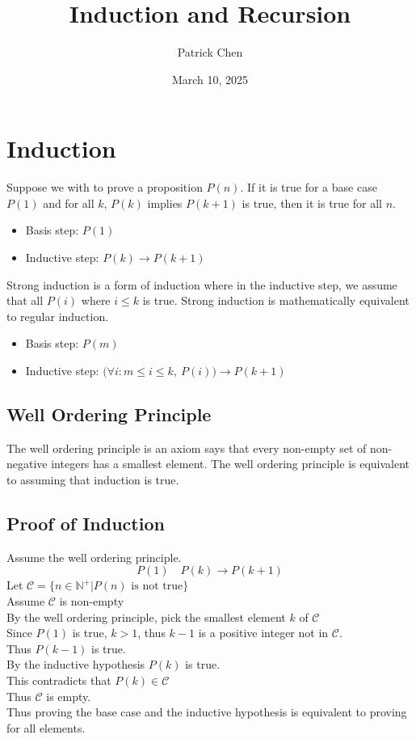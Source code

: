 \documentclass{article}
\title{Induction and Recursion}
\author{Patrick Chen}
\date{March 10, 2025}
\theoremstyle{mytheoremstyle}
\theoremstyle{mytheoremstyle}
\theoremstyle{myproblemstyle}
\begin{document}
    \maketitle
    \section*{Induction}
    Suppose we with to prove a proposition $P(n)$. If it is true for a base case
    $P(1)$ and for all $k$, $P(k)$ implies $P(k+1)$ is true, then it is true for
    all $n$.
    \begin{itemize}
        \item Basis step: $P(1)$
        \item Inductive step: $P(k) \rightarrow P(k+1)$
    \end{itemize}
    Strong induction is a form of induction where in the inductive step, we
    assume that all $P(i)$ where $i\le k$ is true. Strong induction is
    mathematically equivalent to regular induction.
    \begin{itemize}
        \item Basis step: $P(m)$
        \item Inductive step: $\Big(\forall i : m\le i\le k,\ P(i)\Big) \rightarrow P(k+1)$
    \end{itemize}

    \subsection*{Well Ordering Principle}
    The well ordering principle is an axiom says that every non-empty set of
    non-negative integers has a smallest element. The well ordering principle is
    equivalent to assuming that induction is true.

    \subsection*{Proof of Induction}
    Assume the well ordering principle.
    \[
        P(1) \quad P(k) \rightarrow P(k+1)
    \]
    Let $\mathcal{C} = \{n\in \mathbb{N}^+ | P(n) \text{ is not true}\}$ \\
    Assume $\mathcal{C}$ is non-empty \\
    By the well ordering principle, pick the smallest element $k$ of $\mathcal{C}$ \\
    Since $P(1)$ is true, $k>1$, thus $k-1$ is a positive integer not in $\mathcal{C}$. \\
    Thus $P(k-1)$ is true. \\
    By the inductive hypothesis $P(k)$ is true. \\
    This contradicts that $P(k)\in\mathcal{C}$ \\
    Thus $\mathcal{C}$ is empty. \\
    Thus proving the base case and the inductive hypothesis is equivalent to
    proving for all elements.
\end{document}
